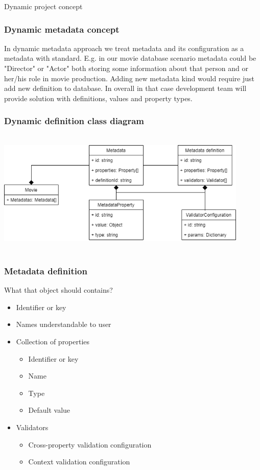 \documentclass{beamer}
\begin{document}
\begin{section}{Dynamic project concept}

\begin{frame}
\frametitle{Dynamic metadata concept}

In dynamic metadata approach we treat metadata and its configuration as a metadata with standard. E.g. in our movie database scenario metadata could be "Director" or "Actor" both storing some information about that person and \/ or her/his role in movie production. Adding new metadata kind would require just add new definition to database.  \pause
\newline
\newline
In overall in that case development team will provide solution with definitions, values and property types. 

\end{frame}

\begin{frame}
\frametitle{Dynamic definition class diagram}
\centering
 \includegraphics[width=12cm, height=6cm]{Dynamic.png}
\end{frame}

\begin{frame}
\frametitle{Metadata definition}

What that object should contains?\\

\begin{itemize}
	\item Identifier or key
	\item Names understandable to user
	\item Collection of properties
		\begin{itemize}
			\item Identifier or key
			\item Name
			\item Type
			\item Default value
		\end{itemize}
	\item Validators
		\begin{itemize}
			\item Cross-property validation configuration
			\item Context validation configuration
		\end{itemize}
\end{itemize}


\end{frame}
\end{section}
\end{document}
